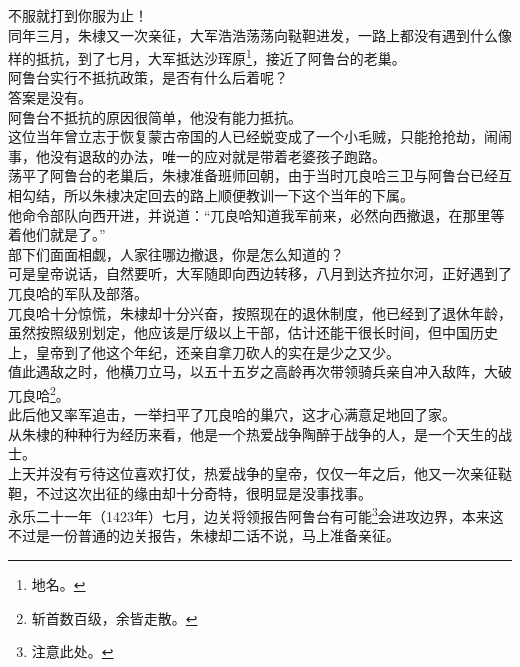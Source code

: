 \begin{multicols}{\theparacolNo}
不服就打到你服为止！\\

同年三月，朱棣又一次亲征，大军浩浩荡荡向鞑靼进发，一路上都没有遇到什么像样的抵抗，到了七月，大军抵达沙珲原\footnote{地名。}，接近了阿鲁台的老巢。\\

阿鲁台实行不抵抗政策，是否有什么后着呢？\\

答案是没有。\\

阿鲁台不抵抗的原因很简单，他没有能力抵抗。\\

这位当年曾立志于恢复蒙古帝国的人已经蜕变成了一个小毛贼，只能抢抢劫，闹闹事，他没有退敌的办法，唯一的应对就是带着老婆孩子跑路。\\

荡平了阿鲁台的老巢后，朱棣准备班师回朝，由于当时兀良哈三卫与阿鲁台已经互相勾结，所以朱棣决定回去的路上顺便教训一下这个当年的下属。\\

他命令部队向西开进，并说道：“兀良哈知道我军前来，必然向西撤退，在那里等着他们就是了。”\\

部下们面面相觑，人家往哪边撤退，你是怎么知道的？\\

可是皇帝说话，自然要听，大军随即向西边转移，八月到达齐拉尔河，正好遇到了兀良哈的军队及部落。\\

兀良哈十分惊慌，朱棣却十分兴奋，按照现在的退休制度，他已经到了退休年龄，虽然按照级别划定，他应该是厅级以上干部，估计还能干很长时间，但中国历史上，皇帝到了他这个年纪，还亲自拿刀砍人的实在是少之又少。\\

值此遇敌之时，他横刀立马，以五十五岁之高龄再次带领骑兵亲自冲入敌阵，大破兀良哈\footnote{斩首数百级，余皆走散。}。\\

此后他又率军追击，一举扫平了兀良哈的巢穴，这才心满意足地回了家。\\

从朱棣的种种行为经历来看，他是一个热爱战争陶醉于战争的人，是一个天生的战士。\\

上天并没有亏待这位喜欢打仗，热爱战争的皇帝，仅仅一年之后，他又一次亲征鞑靼，不过这次出征的缘由却十分奇特，很明显是没事找事。\\

永乐二十一年（1423年）七月，边关将领报告阿鲁台有可能\footnote{注意此处。}会进攻边界，本来这不过是一份普通的边关报告，朱棣却二话不说，马上准备亲征。\\


\end{multicols}
